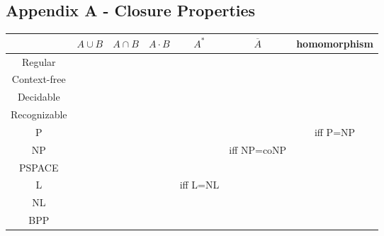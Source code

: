 \subsection{Appendix A - Closure Properties}
\begin{center}
\setlength{\extrarowheight}{.5ex}
\renewcommand{\check}{{\color[HTML]{25c925}\ding{51}}}
\renewcommand{\cross}{{\color{red}\ding{55}}}
\begin{tabular}{|c||c|c|c|c|c|c|}
\hline
             & $A\cup B$ & $A\cap B$    & $A\cdot B$    & $A^*$     & $\overline{A}$ & homomorphism \\ \hline \hline
Regular      & \check    & \check       & \check        & \check    & \check         & \check       \\ \hline
Context-free & \check    & \cross       & \check        & \check    & \cross         & \check       \\ \hline
Decidable    & \check    & \check       & \check        & \check    & \check         & \cross       \\ \hline
Recognizable & \check    & \check       & \check        & \check    & \cross         & \check       \\ \hline
P            & \check    & \check       & \check        & \check    & \check         & iff P=NP     \\ \hline
NP           & \check    & \check       & \check        & \check    & iff NP=coNP    &              \\ \hline
PSPACE       & \check    & \check       & \check        & \check    & \check         &              \\ \hline
L            & \check    & \check       & \check        & iff L=NL  &                &              \\ \hline
NL           & \check    & \check       & \check        & \check    & \check         &              \\ \hline
BPP          & \check    & \check       &               &           & \check         &              \\ \hline
\end{tabular}
\end{center}

